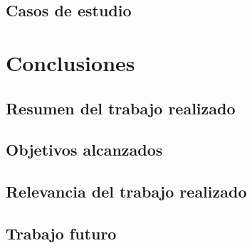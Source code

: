 \documentclass[upright, contnum]{umemoria}
\begin{document}
\section{Casos de estudio}
\label{sec-4.4}

\label{casosest}

\chapter{Conclusiones}
\label{sec-5}

\section{Resumen del trabajo realizado}
\label{sec-5.1}

\section{Objetivos alcanzados}
\label{sec-5.2}

\section{Relevancia del trabajo realizado}
\label{sec-5.3}

\section{Trabajo futuro}
\label{sec-5.4}


   
\end{document}
